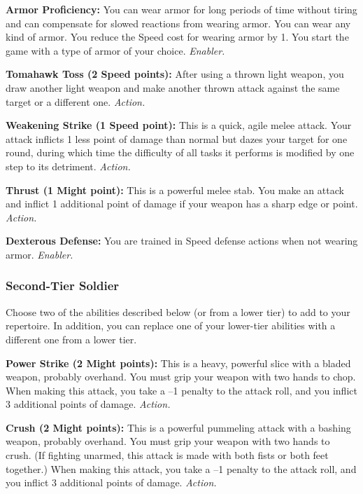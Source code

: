 \documentclass[a4paper,10pt,final,twocolumn,oneside]{book}
\newcommand{\itemAbility}[2]{\textcolor{25gray}{\textbullet\textbf{ #1:}}{ #2}\par}
\newcommand{\enabler}{\textit{ Enabler.}}
\newcommand{\action}{\textit{ Action.}}
\begin{document}
\itemAbility{Armor Proficiency}{You can wear armor for long periods of time without tiring and can compensate for slowed reactions from wearing armor. You can wear any kind of armor. You reduce the Speed cost for wearing armor by 1. You start the game with a type of armor of your choice.\enabler}

\itemAbility{Tomahawk Toss (2 Speed points)}{After using a thrown light weapon, you draw another light weapon and make another thrown attack against the same target or a different one.\action}

\itemAbility{Weakening Strike (1 Speed point)}{This is a quick, agile melee attack. Your attack inflicts 1 less point of damage than normal but dazes your target for one round, during which time the difficulty of all tasks it performs is modified by one step to its detriment.\action}

\itemAbility{Thrust (1 Might point)}{This is a powerful melee stab. You make an attack and inflict 1 additional point of damage if your weapon has a sharp edge or point.\action}

\itemAbility{Dexterous Defense}{You are trained in Speed defense actions when not wearing armor.\enabler}


\subsubsection*{Second-Tier Soldier}
\label{subsub:soldierSecondTier}

Choose two of the abilities described below (or from a lower tier) to add to your repertoire. In addition, you can replace one of your lower-tier abilities with a different one from a lower tier.

\itemAbility{Power Strike (2 Might points)}{This is a heavy, powerful slice with a bladed weapon, probably overhand. You must grip your weapon with two hands to chop. When making this attack, you take a –1 penalty to the attack roll, and you inflict 3 additional points of damage.\action}

\itemAbility{Crush (2 Might points)}{This is a powerful pummeling attack with a bashing weapon, probably overhand. You must grip your weapon with two hands to crush. (If fighting unarmed, this attack is made with both fists or both feet together.) When making this attack, you take a –1 penalty to the attack roll, and you inflict 3 additional points of damage.\action}
\end{document}
